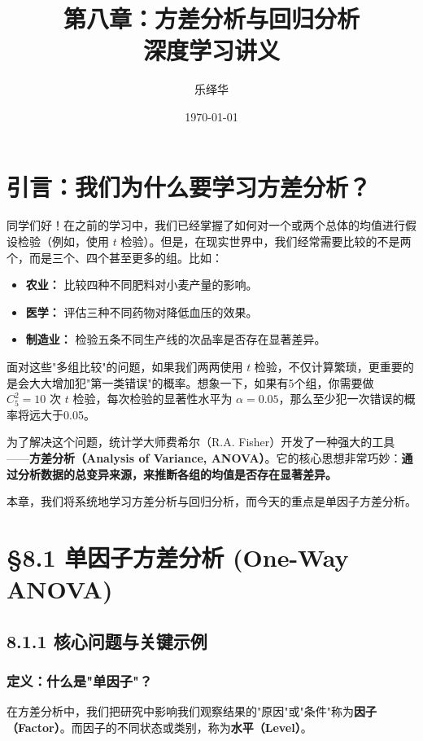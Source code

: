 \documentclass[12pt, a4paper]{amsart}
\title{\textbf{第八章：方差分析与回归分析 \\ 深度学习讲义}}
\author{乐绎华}
\date{\today}
\begin{document}

\section{引言：我们为什么要学习方差分析？}

同学们好！在之前的学习中，我们已经掌握了如何对一个或两个总体的均值进行假设检验（例如，使用 $t$ 检验）。但是，在现实世界中，我们经常需要比较的不是两个，而是三个、四个甚至更多的组。比如：
\begin{itemize}
    \item \textbf{农业：} 比较四种不同肥料对小麦产量的影响。
    \item \textbf{医学：} 评估三种不同药物对降低血压的效果。
    \item \textbf{制造业：} 检验五条不同生产线的次品率是否存在显著差异。
\end{itemize}
面对这些"多组比较"的问题，如果我们两两使用 $t$ 检验，不仅计算繁琐，更重要的是会大大增加犯"第一类错误"的概率。想象一下，如果有5个组，你需要做 $C_5^2 = 10$ 次 $t$ 检验，每次检验的显著性水平为 $\alpha = 0.05$，那么至少犯一次错误的概率将远大于0.05。

为了解决这个问题，统计学大师费希尔（R.A. Fisher）开发了一种强大的工具——\textbf{方差分析（Analysis of Variance, ANOVA）}。它的核心思想非常巧妙：\textbf{通过分析数据的总变异来源，来推断各组的均值是否存在显著差异。}

本章，我们将系统地学习方差分析与回归分析，而今天的重点是单因子方差分析。

\section{§8.1 单因子方差分析 (One-Way ANOVA)}

\subsection{8.1.1 核心问题与关键示例}

\subsubsection{定义：什么是"单因子"？}
在方差分析中，我们把研究中影响我们观察结果的"原因"或"条件"称为\textbf{因子（Factor）}。而因子的不同状态或类别，称为\textbf{水平（Level）}。
\end{document}
